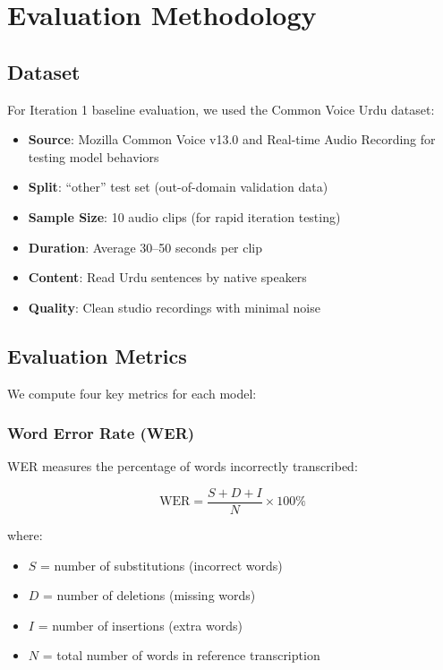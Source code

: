 \section{Evaluation Methodology}

\subsection{Dataset}

For Iteration 1 baseline evaluation, we used the Common Voice Urdu dataset:

\begin{itemize}
    \item \textbf{Source}: Mozilla Common Voice v13.0 and Real-time Audio Recording for testing model behaviors
    \item \textbf{Split}: ``other'' test set (out-of-domain validation data)
    \item \textbf{Sample Size}: 10 audio clips (for rapid iteration testing)
    \item \textbf{Duration}: Average 30--50 seconds per clip
    \item \textbf{Content}: Read Urdu sentences by native speakers
    \item \textbf{Quality}: Clean studio recordings with minimal noise
\end{itemize}

\subsection{Evaluation Metrics}

We compute four key metrics for each model:

\subsubsection{Word Error Rate (WER)}

WER measures the percentage of words incorrectly transcribed:

\begin{equation}
\boxed{
\text{WER} = \frac{S + D + I}{N} \times 100\%
}
\label{eq:wer}
\end{equation}

\noindent where:
\begin{itemize}
    \item $S$ = number of substitutions (incorrect words)
    \item $D$ = number of deletions (missing words)
    \item $I$ = number of insertions (extra words)
    \item $N$ = total number of words in reference transcription
\end{itemize}

